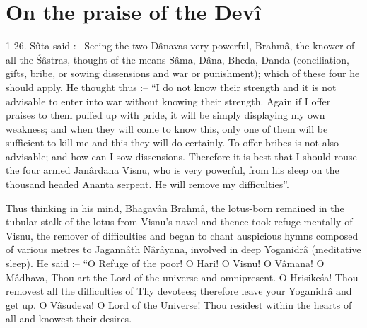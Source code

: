 \chapter{On the praise of the Dev\^i}

1-26. S\^uta said :-- Seeing the two D\^anavas very powerful, Brahm\^a, the knower of all the \'S\^astras, thought of the means S\^ama, D\^ana, Bheda, Danda (conciliation, gifts, bribe, or sowing dissensions and war or punishment); which of these four he should apply. He thought thus :-- ``I do not know their strength and it is not advisable to enter into war without knowing their strength. Again if I offer praises to them puffed up with pride, it will be simply displaying my own weakness; and when they will come to know this, only one of them will be sufficient to kill me and this they will do certainly. To offer bribes is not also advisable; and how can I sow dissensions. Therefore it is best that I should rouse the four armed Jan\^ardana Visnu, who is very powerful, from his sleep on the thousand headed Ananta serpent. He will remove my difficulties''.

Thus thinking in his mind, Bhagav\^an Brahm\^a, the lotus-born remained in the tubular stalk of the lotus from Visnu's navel and thence took refuge mentally of Visnu, the remover of difficulties and began to chant auspicious hymns composed of various metres to Jagann\^ath N\^ar\^ayana, involved in deep Yoganidr\^a (meditative sleep). He said :-- ``O Refuge of the poor! O Hari! O Visnu! O V\^amana! O M\^adhava, Thou art the Lord of the universe and omnipresent. O Hrisike\'sa! Thou removest all the difficulties of Thy devotees; therefore leave your Yoganidr\^a and get up. O V\^asudeva! O Lord of the Universe! Thou residest within the hearts of all and knowest their desires.

